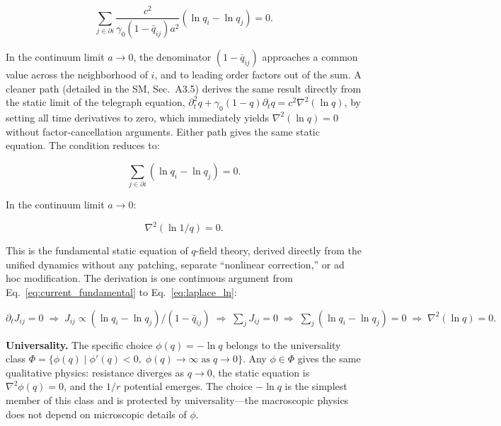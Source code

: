 \documentclass[aps,prd,twocolumn,showpacs,superscriptaddress,preprintnumbers]{revtex4-2}
\begin{document}
\begin{equation}
\sum_{j\in\partial i} \frac{c^2}{\gamma_0(1-\bar{q}_{ij})a^2}(\ln q_i - \ln q_j) = 0.
\label{eq:zero_net_current}
\end{equation}

In the continuum limit $a\to0$, the denominator $(1-\bar{q}_{ij})$ approaches a common value across the neighborhood of $i$, and to leading order factors out of the sum. A cleaner path (detailed in the SM, Sec.~A3.5) derives the same result directly from the static limit of the telegraph equation, $\partial_t^2 q + \gamma_0(1-q)\partial_t q = c^2\nabla^2(\ln q)$, by setting all time derivatives to zero, which immediately yields $\nabla^2(\ln q)=0$ without factor-cancellation arguments. Either path gives the same static equation. The condition reduces to:

\begin{equation}
\sum_{j \in \partial i} (\ln q_i - \ln q_j) = 0.
\label{eq:laplace_ln_disc}
\end{equation}

In the continuum limit $a\to0$:

\begin{equation}
\boxed{\nabla^2(\ln 1/q) = 0}.
\label{eq:laplace_ln}
\end{equation}

This is the fundamental static equation of $q$-field theory, derived directly from the unified dynamics without any patching, separate ``nonlinear correction,'' or ad hoc modification.
The derivation is one continuous argument from Eq.~\eqref{eq:current_fundamental} to Eq.~\eqref{eq:laplace_ln}:

\begin{center}
\small
$\partial_t J_{ij}=0 \;\Rightarrow\; J_{ij} \propto (\ln q_i-\ln q_j)/(1-\bar{q}_{ij}) \;\Rightarrow\; \sum_j J_{ij}=0 \;\Rightarrow\; \sum_j(\ln q_i-\ln q_j)=0 \;\Rightarrow\; \nabla^2(\ln q)=0.$
\end{center}

\textbf{Universality.}
The specific choice $\phi(q)=-\ln q$ belongs to the universality class $\Phi=\{\phi(q) \mid \phi'(q)<0,\;\phi(q)\to\infty\;\text{as}\;q\to0\}$.
Any $\phi\in\Phi$ gives the same qualitative physics: resistance diverges as $q\to0$, the static equation is $\nabla^2\phi(q)=0$, and the $1/r$ potential emerges.
The choice $-\ln q$ is the simplest member of this class and is protected by universality---the macroscopic physics does not depend on microscopic details of $\phi$.
\end{document}
